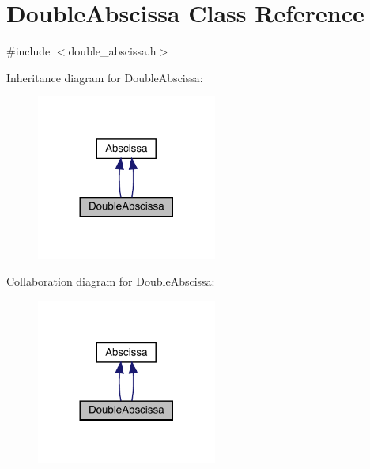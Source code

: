\hypertarget{classDoubleAbscissa}{}\section{Double\+Abscissa Class Reference}
\label{classDoubleAbscissa}


{\ttfamily \#include $<$double\+\_\+abscissa.\+h$>$}



Inheritance diagram for Double\+Abscissa\+:
\nopagebreak
\begin{figure}[H]
\begin{center}
\leavevmode
\includegraphics[width=168pt]{d4/dec/classDoubleAbscissa__inherit__graph}
\end{center}
\end{figure}


Collaboration diagram for Double\+Abscissa\+:
\nopagebreak
\begin{figure}[H]
\begin{center}
\leavevmode
\includegraphics[width=168pt]{d6/d76/classDoubleAbscissa__coll__graph}
\end{center}
\end{figure}
